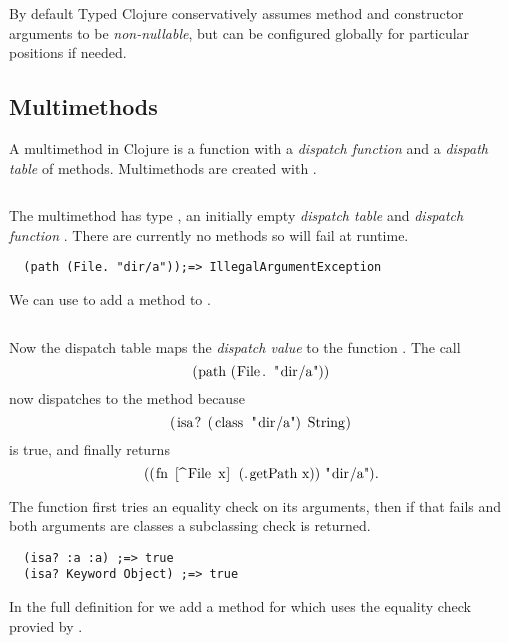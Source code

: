 \begin{exmp}
\inputminted[firstline=15,lastline=16]{clojure}{code/demo/src/demo/parent3.clj}
\end{exmp}

By default Typed Clojure conservatively assumes method and constructor arguments to be \emph{non-nullable},
but can be configured globally for particular positions if needed.

\subsection{Multimethods}

\label{sec:multioverview}

A multimethod in Clojure is a function with a \emph{dispatch
function} and a \emph{dispath table} of methods. Multimethods are created with {}.
\inputminted[firstline=5,lastline=7]{clojure}{code/demo/src/demo/rep.clj}
The multimethod  has type , an initially empty \emph{dispatch table}
and \emph{dispatch function} .
There are currently no methods so  will fail at runtime.
\begin{verbatim}
  (path (File. "dir/a"));=> IllegalArgumentException
\end{verbatim}

We can use {} to add a method to .
\inputminted[firstline=8,lastline=8]{clojure}{code/demo/src/demo/rep.clj}
Now the dispatch table maps
the \emph{dispatch value}  to the function
. 
The call 
$$
\clj{(path (File. "dir/a"))}
$$
now dispatches to the  method because
$$
\clj{(isa? (class "dir/a") String)}
$$
is true, and finally returns 
$$
\clj{((fn [^File x] (.getPath x)) "dir/a")}.
$$

The  function first tries an equality check
on its arguments, then if that fails
and both arguments are classes a subclassing
check is returned.
\begin{verbatim}
  (isa? :a :a) ;=> true
  (isa? Keyword Object) ;=> true
\end{verbatim}

In the full definition for  we add a method for 
which uses the equality check provied by .

\begin{Code}
\begin{exmp}
\inputminted[firstline=5,lastline=11]{clojure}{code/demo/src/demo/rep.clj}
\label{example:rep}
\end{exmp}
\end{Code}

